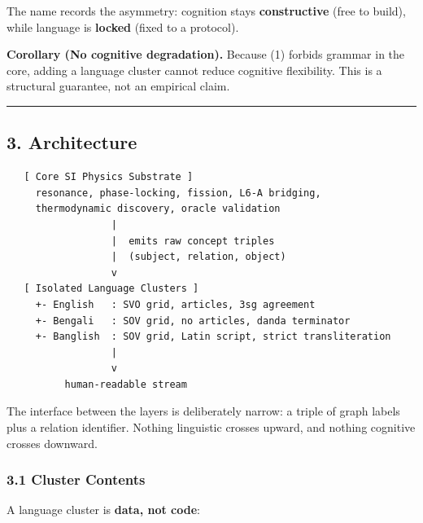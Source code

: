 \documentclass[
  11pt,
  a4paper,
]{article}
\begin{document}
The name records the asymmetry: cognition stays \textbf{constructive}
(free to build), while language is \textbf{locked} (fixed to a
protocol).

\textbf{Corollary (No cognitive degradation).} Because (1) forbids
grammar in the core, adding a language cluster cannot reduce cognitive
flexibility. This is a structural guarantee, not an empirical claim.

\begin{center}\rule{0.5\linewidth}{0.5pt}\end{center}

\subsection{3. Architecture}\label{architecture}

\begin{verbatim}
   [ Core SI Physics Substrate ]
     resonance, phase-locking, fission, L6-A bridging,
     thermodynamic discovery, oracle validation
                  |
                  |  emits raw concept triples
                  |  (subject, relation, object)
                  v
   [ Isolated Language Clusters ]
     +- English   : SVO grid, articles, 3sg agreement
     +- Bengali   : SOV grid, no articles, danda terminator
     +- Banglish  : SOV grid, Latin script, strict transliteration
                  |
                  v
          human-readable stream
\end{verbatim}

The interface between the layers is deliberately narrow: a triple of
graph labels plus a relation identifier. Nothing linguistic crosses
upward, and nothing cognitive crosses downward.

\subsubsection{3.1 Cluster Contents}\label{cluster-contents}

A language cluster is \textbf{data, not code}:
\end{document}

